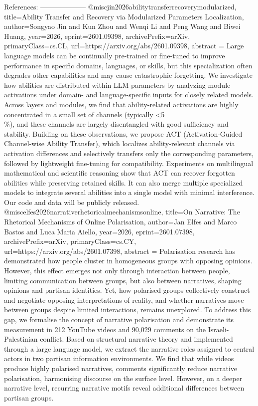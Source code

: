         References:
        --------------------
        @misc{jin2026abilitytransferrecoverymodularized,
      title={Ability Transfer and Recovery via Modularized Parameters Localization}, 
      author={Songyao Jin and Kun Zhou and Wenqi Li and Peng Wang and Biwei Huang},
      year={2026},
      eprint={2601.09398},
      archivePrefix={arXiv},
      primaryClass={cs.CL},
      url={https://arxiv.org/abs/2601.09398},
      abstract = {Large language models can be continually pre-trained or fine-tuned to improve performance in specific domains, languages, or skills, but this specialization often degrades other capabilities and may cause catastrophic forgetting. We investigate how abilities are distributed within LLM parameters by analyzing module activations under domain- and language-specific inputs for closely related models. Across layers and modules, we find that ability-related activations are highly concentrated in a small set of channels (typically <5\\\%), and these channels are largely disentangled with good sufficiency and stability. Building on these observations, we propose ACT (Activation-Guided Channel-wise Ability Transfer), which localizes ability-relevant channels via activation differences and selectively transfers only the corresponding parameters, followed by lightweight fine-tuning for compatibility. Experiments on multilingual mathematical and scientific reasoning show that ACT can recover forgotten abilities while preserving retained skills. It can also merge multiple specialized models to integrate several abilities into a single model with minimal interference. Our code and data will be publicly released.}
}@misc{elfes2026narrativerhetoricalmechanismsonline,
      title={On Narrative: The Rhetorical Mechanisms of Online Polarisation}, 
      author={Jan Elfes and Marco Bastos and Luca Maria Aiello},
      year={2026},
      eprint={2601.07398},
      archivePrefix={arXiv},
      primaryClass={cs.CY},
      url={https://arxiv.org/abs/2601.07398},
      abstract = {Polarisation research has demonstrated how people cluster in homogeneous groups with opposing opinions. However, this effect emerges not only through interaction between people, limiting communication between groups, but also between narratives, shaping opinions and partisan identities. Yet, how polarised groups collectively construct and negotiate opposing interpretations of reality, and whether narratives move between groups despite limited interactions, remains unexplored. To address this gap, we formalise the concept of narrative polarisation and demonstrate its measurement in 212 YouTube videos and 90,029 comments on the Israeli-Palestinian conflict. Based on structural narrative theory and implemented through a large language model, we extract the narrative roles assigned to central actors in two partisan information environments. We find that while videos produce highly polarised narratives, comments significantly reduce narrative polarisation, harmonising discourse on the surface level. However, on a deeper narrative level, recurring narrative motifs reveal additional differences between partisan groups.}
}
